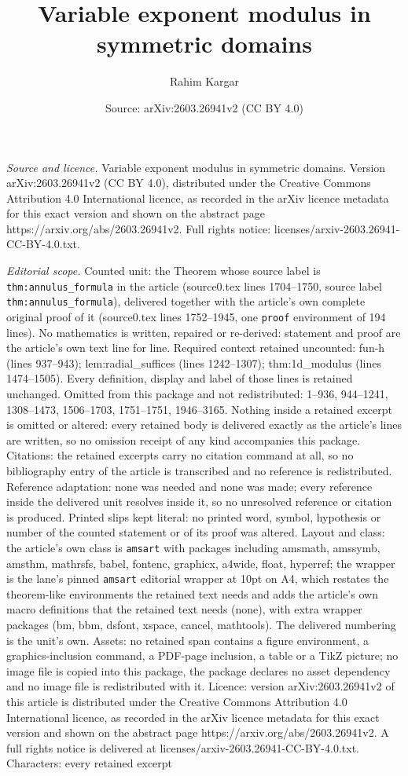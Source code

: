 \documentclass[10pt,a4paper]{amsart}
\title[Variable exponent modulus in symmetric domains]{Variable exponent modulus in symmetric domains}
\author{Rahim Kargar}
\date{Source: arXiv:2603.26941v2 (CC BY 4.0)}
\begin{document}
\maketitle

\noindent\emph{Source and licence.} Variable exponent modulus in symmetric domains. Version arXiv:2603.26941v2 (CC BY 4.0), distributed under the Creative Commons Attribution 4.0 International licence, as recorded in the arXiv licence metadata for this exact version and shown on the abstract page https://arxiv.org/abs/2603.26941v2. Full rights notice: licenses/arxiv-2603.26941-CC-BY-4.0.txt.\par\smallskip

\noindent\textit{Editorial scope.} Counted unit: the Theorem whose source label is \texttt{thm:annulus\_formula} in the article (source0.tex lines 1704--1750, source label \texttt{thm:annulus\_formula}), delivered together with the article's own complete original proof of it (source0.tex lines 1752--1945, one \texttt{proof} environment of 194 lines). No mathematics is written, repaired or re-derived: statement and proof are the article's own text line for line. Required context retained uncounted: fun-h (lines 937--943); lem:radial\_suffices (lines 1242--1307); thm:1d\_modulus (lines 1474--1505). Every definition, display and label of those lines is retained unchanged. Omitted from this package and not redistributed: 1--936, 944--1241, 1308--1473, 1506--1703, 1751--1751, 1946--3165. Nothing inside a retained excerpt is omitted or altered: every retained body is delivered exactly as the article's lines are written, so no omission receipt of any kind accompanies this package. Citations: the retained excerpts carry no citation command at all, so no bibliography entry of the article is transcribed and no reference is redistributed. Reference adaptation: none was needed and none was made; every reference inside the delivered unit resolves inside it, so no unresolved reference or citation is produced. Printed slips kept literal: no printed word, symbol, hypothesis or number of the counted statement or of its proof was altered. Layout and class: the article's own class is \texttt{amsart} with packages including amsmath, amssymb, amsthm, mathrsfs, babel, fontenc, graphicx, a4wide, float, hyperref; the wrapper is the lane's pinned \texttt{amsart} editorial wrapper at 10pt on A4, which restates the theorem-like environments the retained text needs and adds the article's own macro definitions that the retained text needs (none), with extra wrapper packages (bm, bbm, dsfont, xspace, cancel, mathtools). The delivered numbering is the unit's own. Assets: no retained span contains a figure environment, a graphics-inclusion command, a PDF-page inclusion, a table or a TikZ picture; no image file is copied into this package, the package declares no asset dependency and no image file is redistributed with it. Licence: version arXiv:2603.26941v2 of this article is distributed under the Creative Commons Attribution 4.0 International licence, as recorded in the arXiv licence metadata for this exact version and shown on the abstract page https://arxiv.org/abs/2603.26941v2. A full rights notice is delivered at licenses/arxiv-2603.26941-CC-BY-4.0.txt. Characters: every retained excerpt 
\end{document}
